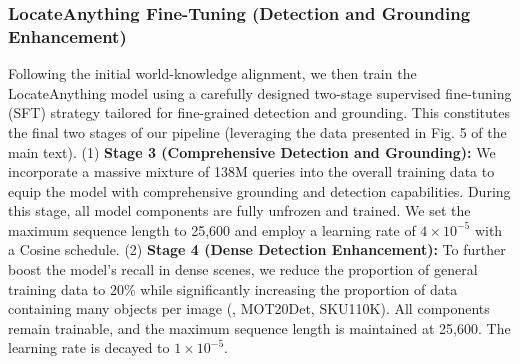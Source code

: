 

\subsubsection{LocateAnything Fine-Tuning (Detection and Grounding Enhancement)}
Following the initial world-knowledge alignment, we then train the LocateAnything model using a carefully designed two-stage supervised fine-tuning (SFT) strategy tailored for fine-grained detection and grounding. This constitutes the final two stages of our pipeline (leveraging the data presented in Fig. 5 of the main text). 
(1) \textbf{Stage 3 (Comprehensive Detection and Grounding):} We incorporate a massive mixture of 138M queries into the overall training data to equip the model with comprehensive grounding and detection capabilities. During this stage, all model components are fully unfrozen and trained. We set the maximum sequence length to 25,600 and employ a learning rate of $4 \times 10^{-5}$ with a Cosine schedule. 
(2) \textbf{Stage 4 (Dense Detection Enhancement):} To further boost the model's recall in dense scenes, we reduce the proportion of general training data to 20\% while significantly increasing the proportion of data containing many objects per image (\eg, MOT20Det, SKU110K). All components remain trainable, and the maximum sequence length is maintained at 25,600. The learning rate is decayed to $1 \times 10^{-5}$.

